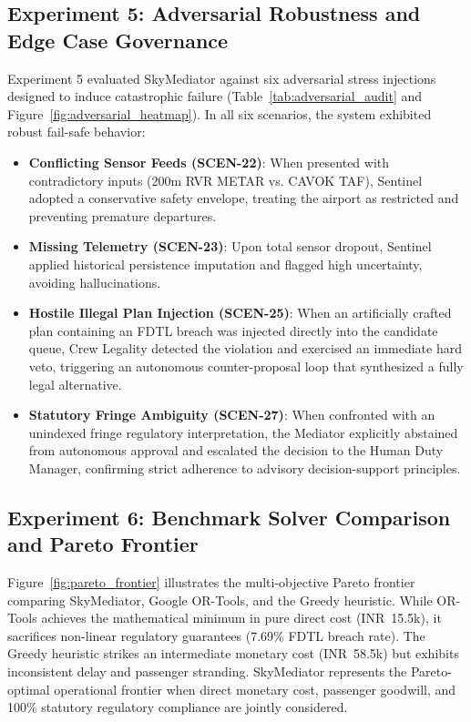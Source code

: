 \subsection{Experiment 5: Adversarial Robustness and Edge Case Governance}
Experiment 5 evaluated SkyMediator against six adversarial stress injections designed to induce catastrophic failure (Table~\ref{tab:adversarial_audit} and Figure~\ref{fig:adversarial_heatmap}). In all six scenarios, the system exhibited robust fail-safe behavior:
\begin{itemize}
    \item \textbf{Conflicting Sensor Feeds (SCEN-22)}: When presented with contradictory inputs (200m RVR METAR vs. CAVOK TAF), Sentinel adopted a conservative safety envelope, treating the airport as restricted and preventing premature departures.
    \item \textbf{Missing Telemetry (SCEN-23)}: Upon total sensor dropout, Sentinel applied historical persistence imputation and flagged high uncertainty, avoiding hallucinations.
    \item \textbf{Hostile Illegal Plan Injection (SCEN-25)}: When an artificially crafted plan containing an FDTL breach was injected directly into the candidate queue, Crew Legality detected the violation and exercised an immediate hard veto, triggering an autonomous counter-proposal loop that synthesized a fully legal alternative.
    \item \textbf{Statutory Fringe Ambiguity (SCEN-27)}: When confronted with an unindexed fringe regulatory interpretation, the Mediator explicitly abstained from autonomous approval and escalated the decision to the Human Duty Manager, confirming strict adherence to advisory decision-support principles.
\end{itemize}

\subsection{Experiment 6: Benchmark Solver Comparison and Pareto Frontier}
Figure~\ref{fig:pareto_frontier} illustrates the multi-objective Pareto frontier comparing SkyMediator, Google OR-Tools, and the Greedy heuristic. While OR-Tools achieves the mathematical minimum in pure direct cost (INR~15.5k), it sacrifices non-linear regulatory guarantees (7.69\% FDTL breach rate). The Greedy heuristic strikes an intermediate monetary cost (INR~58.5k) but exhibits inconsistent delay and passenger stranding. SkyMediator represents the Pareto-optimal operational frontier when direct monetary cost, passenger goodwill, and 100\% statutory regulatory compliance are jointly considered.

